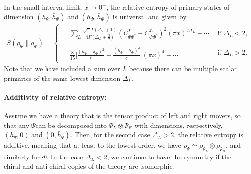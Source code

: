 \documentclass[11pt]{article}
\newcommand{\lb}{\left(}
\newcommand{\rb}{\right)}
\begin{document}
  In the small interval limit, $x\to 0^+$, the relative entropy of primary states of dimension 
  $(h_\Psi,\bar{h}_\Psi)$ and $(h_\Phi,\bar{h}_\Phi)$
  is universal and given by  
\begin{align}\label{Ssmallx}
\boxed{
S(\rho_\Psi\|\rho_\Phi)
=
\begin{cases}
\begin{aligned}
&\sum_L\frac{\sqrt{\pi}\Gamma(\Delta_L+1)}
{4\Gamma(\Delta_L+\frac32)}
(C^L_{\Psi\Psi^*}-C^L_{\Phi\Phi^*})^2 
(\pi x)^{2\Delta_L}
+\cdots
\end{aligned}
&
\text{if }\Delta_L< 2,
\\[2ex]
\begin{aligned}
&\frac{8}{15}
\Bigg[
\frac{(h_\Psi-h_\Phi)^2}{c} 
+\frac{(\bar h_\Psi-\bar h_\Phi)^2}{\bar c}
\Bigg]
(\pi x)^4
+\cdots
\end{aligned}
&
\text{if }\Delta_L>2 .
\end{cases}
}
\end{align}
Note that we have included a sum over $L$ because there can be multiple scalar primaries of the same lowest dimension $\Delta_L$. 

\paragraph{Additivity of relative entropy:} Assume we have a theory that is the tensor product of left and right movers, so that any $\Psi$can be decomposed into $\Psi_L\otimes \Psi_R$ with dimensions, respectively, $(h_\Psi,0)$ and $(0,\bar{h}_\Psi)$. Then, for the second case $\Delta_L>2$, the relative entropy is additive, meaning that at least to the lowest order, we have $\rho_\Psi\simeq\rho_{\Psi_L}\otimes \rho_{\Psi_R}$, and similarly for $\Phi$. In the case $\Delta_L<2$, we continue to have the symmetry if the chiral and anti-chiral copies of the theory are isomorphic.
\end{document}
